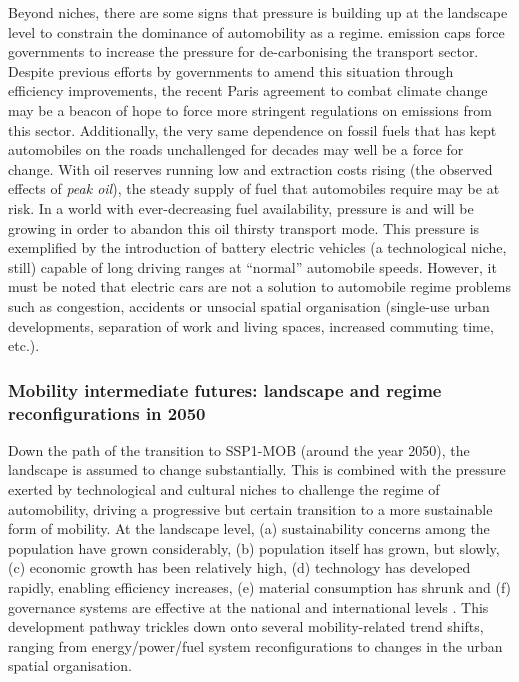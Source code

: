 Beyond niches, there are some signs that pressure is building up at the landscape level to constrain the dominance of automobility as a regime.  emission caps force governments to increase the pressure for de-carbonising the transport sector. Despite previous efforts by governments to amend this situation through efficiency improvements, the recent Paris agreement to combat climate change may be a beacon of hope to force more stringent regulations on  emissions from this sector. Additionally, the very same dependence on fossil fuels that has kept automobiles on the roads unchallenged for decades may well be a force for change. With oil reserves running low and extraction costs rising (the observed effects of \emph{peak oil}), the steady supply of fuel that automobiles require may be at risk. In a world with ever-decreasing fuel availability, pressure is and will be growing in order to abandon this oil thirsty transport mode. This pressure is exemplified by the introduction of battery electric vehicles (a technological niche, still) capable of long driving ranges at ``normal'' automobile speeds. However, it must be noted that electric cars are not a solution to automobile regime problems such as congestion, accidents or unsocial spatial organisation (single-use urban developments, separation of work and living spaces, increased commuting time, etc.).

\subsubsection*{Mobility intermediate futures: landscape and regime reconfigurations in 2050}
Down the path of the transition to SSP1-MOB (around the year 2050), the landscape is assumed to change substantially. This is combined with the pressure exerted by technological and cultural niches to challenge the regime of automobility, driving a progressive but certain transition to a more sustainable form of mobility. At the landscape level, (a) sustainability concerns among the population have grown considerably, (b) population itself has grown, but slowly, (c) economic growth has been relatively high, (d) technology has developed rapidly, enabling efficiency increases, (e) material consumption has shrunk and (f) governance systems are effective at the national and international levels \parencite{vuuren2017_Energylanduse}. This development pathway trickles down onto several mobility-related trend shifts, ranging from energy/power/fuel system reconfigurations to changes in the urban spatial organisation.

